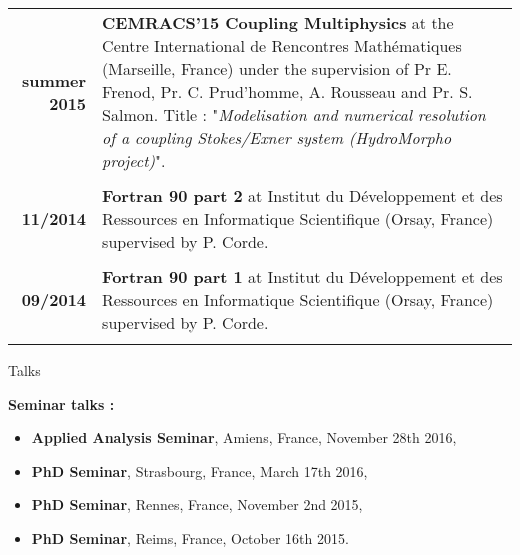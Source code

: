 \documentclass[10pt,a4paper]{report}
\begin{document}
\vspace{0.6cm}

\begin{center}
\begin{tabular}{r p{12cm}}
\textbf{summer 2015} & \textbf{CEMRACS'15 Coupling Multiphysics} at the Centre International de Rencontres Mathématiques (Marseille, France) under the supervision of Pr E. Frenod, Pr. C. Prud'homme, A. Rousseau and Pr. S. Salmon.\newline
Title : "\textit{Modelisation and numerical resolution of a coupling Stokes/Exner system (HydroMorpho project)}".\\

& \\

\textbf{11/2014} & \textbf{Fortran 90 part 2} at Institut du Développement et des Ressources en Informatique Scientifique (Orsay, France) supervised by P. Corde.\\

& \\

\textbf{09/2014} & \textbf{Fortran 90 part 1} at Institut du Développement et des Ressources en Informatique Scientifique (Orsay, France) supervised by P. Corde.\\

& \\

\end{tabular}
\end{center}


\vspace{1cm}
\noindent
{\selectfont
\begin{Large}
Talks
\end{Large}
\hrulefill
}

\noindent


\vspace{0.4cm}
\noindent
{\selectfont
\textbf{Seminar talks :}
}

\begin{itemize}
\item \textbf{Applied Analysis Seminar}, Amiens, France, November 28th 2016,
\item \textbf{PhD Seminar}, Strasbourg, France, March 17th 2016,
\item \textbf{PhD Seminar}, Rennes, France, November 2nd 2015,
\item \textbf{PhD Seminar}, Reims, France, October 16th 2015.
\end{itemize}
\end{document}
